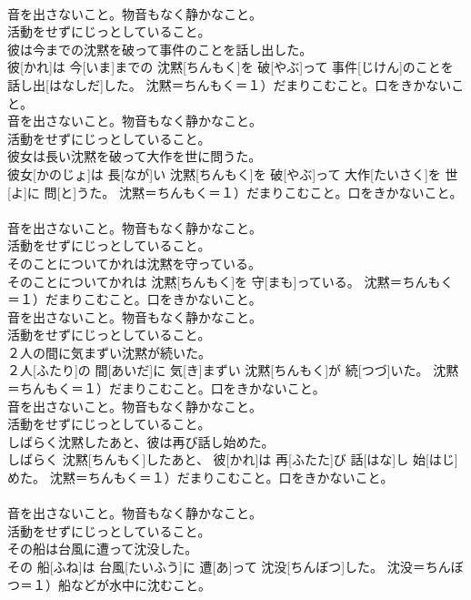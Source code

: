 \documentclass[8pt]{extreport}
\begin{document}
\begin{CJK}{UTF8}{min}
{\\	音を出さないこと。物音もなく静かなこと。 　　　　　　　　
\\	活動をせずにじっとしていること。
\\	彼は今までの沈黙を破って事件のことを話し出した。	
\\	彼[かれ]は 今[いま]までの 沈黙[ちんもく]を 破[やぶ]って 事件[じけん]のことを 話し出[はなしだ]した。	沈黙＝ちんもく＝１）だまりこむこと。口をきかないこと。 　　　　　　　　
\\	音を出さないこと。物音もなく静かなこと。 　　　　　　　　
\\	活動をせずにじっとしていること。
\\	彼女は長い沈黙を破って大作を世に問うた。	
\\	彼女[かのじょ]は 長[なが]い 沈黙[ちんもく]を 破[やぶ]って 大作[たいさく]を 世[よ]に 問[と]うた。	沈黙＝ちんもく＝１）だまりこむこと。口をきかないこと。 　　　　　　　　
\\	音を出さないこと。物音もなく静かなこと。 　　　　　　　　
\\	活動をせずにじっとしていること。
\\	そのことについてかれは沈黙を守っている。	
\\	そのことについてかれは 沈黙[ちんもく]を 守[まも]っている。	沈黙＝ちんもく＝１）だまりこむこと。口をきかないこと。 　　　　　　　　
\\	音を出さないこと。物音もなく静かなこと。 　　　　　　　　
\\	活動をせずにじっとしていること。
\\	２人の間に気まずい沈黙が続いた。	
\\	２人[ふたり]の 間[あいだ]に 気[き]まずい 沈黙[ちんもく]が 続[つづ]いた。	沈黙＝ちんもく＝１）だまりこむこと。口をきかないこと。 　　　　　　　　
\\	音を出さないこと。物音もなく静かなこと。 　　　　　　　　
\\	活動をせずにじっとしていること。
\\	しばらく沈黙したあと、彼は再び話し始めた。	
\\	しばらく 沈黙[ちんもく]したあと、 彼[かれ]は 再[ふたた]び 話[はな]し 始[はじ]めた。	沈黙＝ちんもく＝１）だまりこむこと。口をきかないこと。 　　　　　　　　
\\	音を出さないこと。物音もなく静かなこと。 　　　　　　　　
\\	活動をせずにじっとしていること。
\\	その船は台風に遭って沈没した。	
\\	その 船[ふね]は 台風[たいふう]に 遭[あ]って 沈没[ちんぼつ]した。	沈没＝ちんぼつ＝１）船などが水中に沈むこと。 　　　　　　　　
}
\end{CJK}
\end{document}
